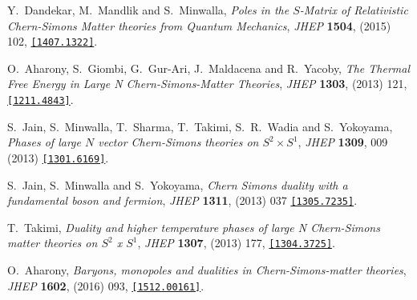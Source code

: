 \begin{thebibliography}{99}
  Y.~Dandekar, M.~Mandlik and S.~Minwalla,
 {\it Poles in the $S$-Matrix of Relativistic Chern-Simons Matter theories from Quantum Mechanics},
 {\it JHEP} {\bf 1504}, (2015) 102,  
  \href{https://arxiv.org/abs/1407.1322}{\tt[1407.1322]}.


  O.~Aharony, S.~Giombi, G.~Gur-Ari, J.~Maldacena and R.~Yacoby,
  {\it The Thermal Free Energy in Large N Chern-Simons-Matter Theories},
  {\it JHEP} {\bf 1303}, (2013) 121, 
  \href{https://arxiv.org/abs/1211.4843}{\tt[1211.4843]}.

  S.~Jain, S.~Minwalla, T.~Sharma, T.~Takimi, S.~R.~Wadia and S.~Yokoyama,
 {\it Phases of large $N$ vector Chern-Simons theories on $S^2 \times S^1$},
  {\it JHEP} {\bf 1309}, 009 (2013)
  \href{https://arxiv.org/abs/1301.6169}{\tt[1301.6169]}.
  
  S.~Jain, S.~Minwalla and S.~Yokoyama,
  {\it Chern Simons duality with a fundamental boson and fermion},
  {\it JHEP} {\bf 1311}, (2013) 037 
   \href{https://arxiv.org/abs/1305.7235}{\tt[1305.7235]}.

  
  T.~Takimi,
 {\it Duality and higher temperature phases of large N Chern-Simons matter theories on $S^2$ x $S^1$},
{\it JHEP} {\bf 1307}, (2013) 177,  
  \href{https://arxiv.org/abs/1304.3725}{\tt[1304.3725]}.

  O.~Aharony,
  {\it Baryons, monopoles and dualities in Chern-Simons-matter theories}, 
  {\it JHEP} {\bf 1602},  (2016) 093, 
  \href{https://arxiv.org/abs/1512.00161}{\tt[1512.00161]}.


\end{thebibliography}
